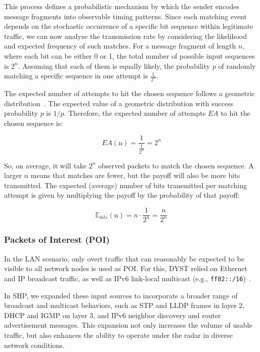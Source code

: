 \documentclass[journal]{IEEEtran}
\begin{document}
This process defines a probabilistic mechanism by which the sender encodes message fragments into observable timing patterns. Since each matching event depends on the stochastic occurrence of a specific bit sequence within legitimate traffic, we can now analyze the transmission rate by considering the likelihood and expected frequency of such matches. For a message fragment of length $n$, where each bit can be either 0 or 1, the total number of possible input sequences is $2^n$. Assuming that each of them is equally likely, the probability \( p \) of randomly matching a specific sequence in one attempt is \( \frac{1}{2^{n}} \). 

The expected number of attempts to hit the chosen sequence follows a geometric distribution~\cite{beria2006confidence}. The expected value of a geometric distribution with success probability \( p \) is \( 1/p \). Therefore, the expected number of attempts \( EA \) to hit the chosen sequence is:

\begin{equation}
\label{eq:expected_attempts_per_sequence}
EA(\text{n}) = \frac{1}{\frac{1}{2^{n}}} = 2^{n}
\end{equation}

So, on average, it will take \( 2^{n} \) observed packets to match the chosen sequence. A larger $n$ means that matches are fewer, but the payoff will also be more bits transmitted. The expected (average) number of bits transmitted per matching attempt is given by multiplying the payoff by the probability of that payoff:

\begin{equation}
\label{eq:bits_per_attempt}
\mathbb{E}_{bits}(\text{n}) = n \cdot \frac{1}{2^n} = \frac{n}{2^n}
\end{equation}

\subsubsection{Packets of Interest (POI)}
In the LAN scenario, only overt traffic that can reasonably be expected to be visible to all network nodes is used as \ac{POI}. For this, \ac{DYST} relied on Ethernet and \ac{IP} broadcast traffic, as well as IPv6 link-local multicast (e.g., \texttt{ff02::/16})~\cite{DYST22}. 

In \ac{SHP}, we expanded these input sources to incorporate a broader range of broadcast and multicast behaviors, such as STP and LLDP frames in layer 2, DHCP and IGMP on layer 3, and \ac{IP}v6 neighbor discovery and router advertisement messages. This expansion not only increases the volume of usable traffic, but also enhances the ability to operate under the radar in diverse network conditions.
\end{document}
